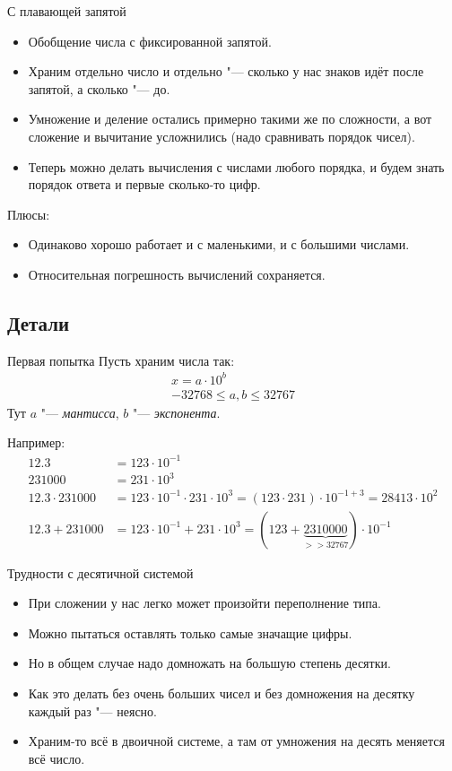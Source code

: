 \begin{frame}{С плавающей запятой}
	\begin{itemize}
		\item
			Обобщение числа с фиксированной запятой.
		\item
			Храним отдельно число и отдельно "--- сколько у нас знаков идёт после запятой, а сколько "--- до.
		\item
			Умножение и деление остались примерно такими же по сложности, а вот сложение и вычитание усложнились (надо сравнивать порядок чисел).
		\item
			Теперь можно делать вычисления с числами любого порядка, и будем знать порядок ответа и первые сколько-то цифр.
	\end{itemize}
	Плюсы:
	\begin{itemize}
		\item
			Одинаково хорошо работает и с маленькими, и с большими числами.
		\item
			Относительная погрешность вычислений сохраняется.
	\end{itemize}
\end{frame}

\subsection{Детали}
\begin{frame}{Первая попытка}
	Пусть храним числа так:
	\begin{gather*}
		x = a \cdot 10^{b} \\
		-32768 \le a, b \le 32767
	\end{gather*}
	Тут $a$ "--- \textit{мантисса}, $b$ "--- \textit{экспонента}.

	Например:
	\begin{align*}
		12.3 &= 123 \cdot 10^{-1} \\
		231000 &= 231 \cdot 10^3 \\
		12.3 \cdot 231000 &= 123 \cdot 10^{-1} \cdot 231 \cdot 10^3 = (123 \cdot 231) \cdot 10^{-1+3} = 28413 \cdot 10^2 \\
		12.3 + 231000 &= 123 \cdot 10^{-1} + 231 \cdot 10^3 = (123 + \underbrace{2310000}_{>>32767}) \cdot 10^{-1}
	\end{align*}
\end{frame}

\begin{frame}{Трудности с десятичной системой}
	\begin{itemize}
		\item При сложении у нас легко может произойти переполнение типа.
		\item Можно пытаться оставлять только самые значащие цифры.
		\item Но в общем случае надо домножать на большую степень десятки.
		\item Как это делать без очень больших чисел и без домножения на десятку каждый раз "--- неясно.
		\item Храним-то всё в двоичной системе, а там от умножения на десять меняется всё число.
	\end{itemize}
\end{frame}

